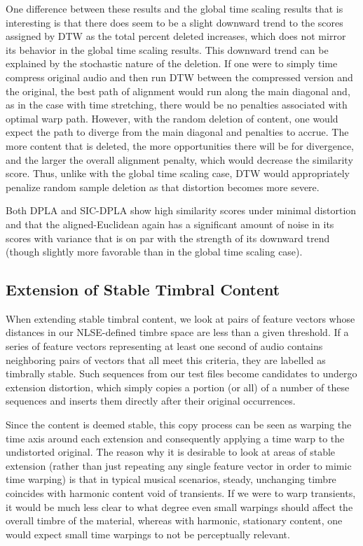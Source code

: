 \documentclass[12pt]{report} 	%
\numberwithin{figure}{chapter}
\numberwithin{table}{chapter}
\numberwithin{equation}{chapter}
\begin{document}
\begin{flushleft}
One difference between these results and the global time scaling results that is interesting is that there does seem to be a slight downward trend to the scores assigned by DTW as the total percent deleted increases, which does not mirror its behavior in the global time scaling results. This downward trend can be explained by the stochastic nature of the deletion. If one were to simply time compress original audio and then run DTW between the compressed version and the original, the best path of alignment would run along the main diagonal and, as in the case with time stretching, there would be no penalties associated with optimal warp path. However, with the random deletion of content, one would expect the path to diverge from the main diagonal and penalties to accrue. The more content that is deleted, the more opportunities there will be for divergence, and the larger the overall alignment penalty, which would decrease the similarity score. Thus, unlike with the global time scaling case, DTW would appropriately penalize random sample deletion as that distortion becomes more severe.

Both DPLA and SIC-DPLA show high similarity scores under minimal distortion and that the aligned-Euclidean again has a significant amount of noise in its scores with variance that is on par with the strength of its downward trend (though slightly more favorable than in the global time scaling case).

\subsection{Extension of Stable Timbral Content}
When extending stable timbral content, we look at pairs of feature vectors whose distances in our NLSE-defined timbre space are less than a given threshold. If a series of feature vectors representing at least one second of audio contains neighboring pairs of vectors that all meet this criteria, they are labelled as timbrally stable. Such sequences from our test files become candidates to undergo extension distortion, which simply copies a portion (or all) of a number of these sequences and inserts them directly after their original occurrences.

Since the content is deemed stable, this copy process can be seen as warping the time axis around each extension and consequently applying a time warp to the undistorted original. The reason why it is desirable to look at areas of stable extension (rather than just repeating any single feature vector in order to mimic time warping) is that in typical musical scenarios, steady, unchanging timbre coincides with harmonic content void of transients. If we were to warp transients, it would be much less clear to what degree even small warpings should affect the overall timbre of the material, whereas with harmonic, stationary content, one would expect small time warpings to not be perceptually relevant.


\end{flushleft}
\end{document}

